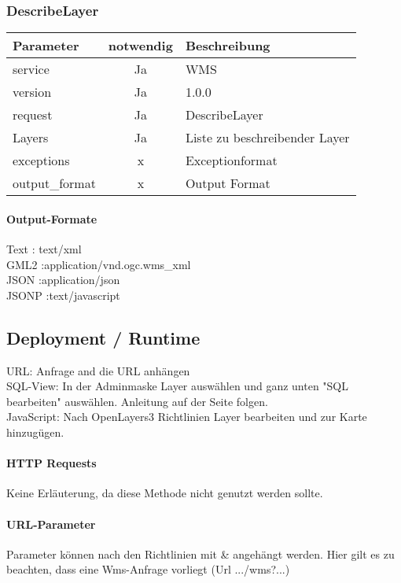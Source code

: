 \subsubsection{DescribeLayer}
\begin{tabular}{lcl} 
\textbf{Parameter} & \textbf{notwendig} & \textbf{Beschreibung} \\ 
\hline 
service & Ja & WMS \\ 
\hline 
version & Ja & 1.0.0 \\ 
\hline 
request & Ja & DescribeLayer \\ 
\hline 
Layers & Ja & Liste zu beschreibender Layer \\ 
\hline 
exceptions & x & Exceptionformat \\ 
\hline 
output\_format & x & Output Format \\ 
\hline 
\end{tabular} 
\paragraph*{Output-Formate\\}
Text : text/xml\\
GML2 :application/vnd.ogc.wms\_xml\\
JSON :application/json\\
JSONP :text/javascript\\

\subsection{Deployment / Runtime}
URL: Anfrage and die URL anh\"angen\\
SQL-View: In der Adminmaske Layer ausw\"ahlen und ganz unten "SQL bearbeiten" ausw\"ahlen. Anleitung auf der Seite folgen.\\
JavaScript: Nach OpenLayers3 Richtlinien Layer bearbeiten und zur Karte hinzug\"ugen.
\paragraph{HTTP Requests}
Keine Erl\"auterung, da diese Methode nicht genutzt werden sollte.\\
\paragraph{URL-Parameter}
Parameter k\"onnen nach den Richtlinien mit \& angeh\"angt werden. Hier gilt es zu beachten, dass eine Wms-Anfrage vorliegt (Url .../wms?...)\\
